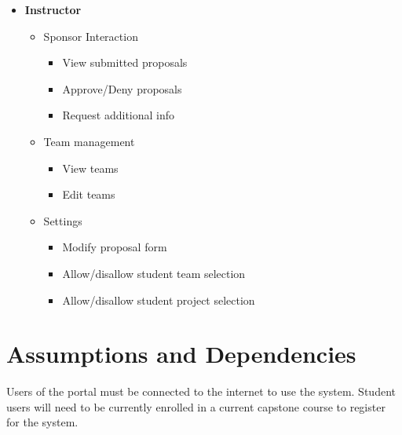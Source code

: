 \documentclass[12pt]{article}
\begin{document}
\begin{itemize}
	\item \textbf{Instructor}
	\begin{itemize}
		\item Sponsor Interaction
		\begin{itemize}
			\item View submitted proposals
			\item Approve/Deny proposals
			\item Request additional info
		\end{itemize}
		\item Team management
		\begin{itemize}
			\item View teams
			\item Edit teams
		\end{itemize}
		\item Settings
		\begin{itemize}
			\item Modify proposal form
			\item Allow/disallow student team selection
			\item Allow/disallow student project selection
		\end{itemize}
	\end{itemize}
\end{itemize}

\section{Assumptions and Dependencies}
Users of the portal must be connected to the internet to use the system.
Student users will need to be currently enrolled in a current capstone course to register for the system.
\end{document}
